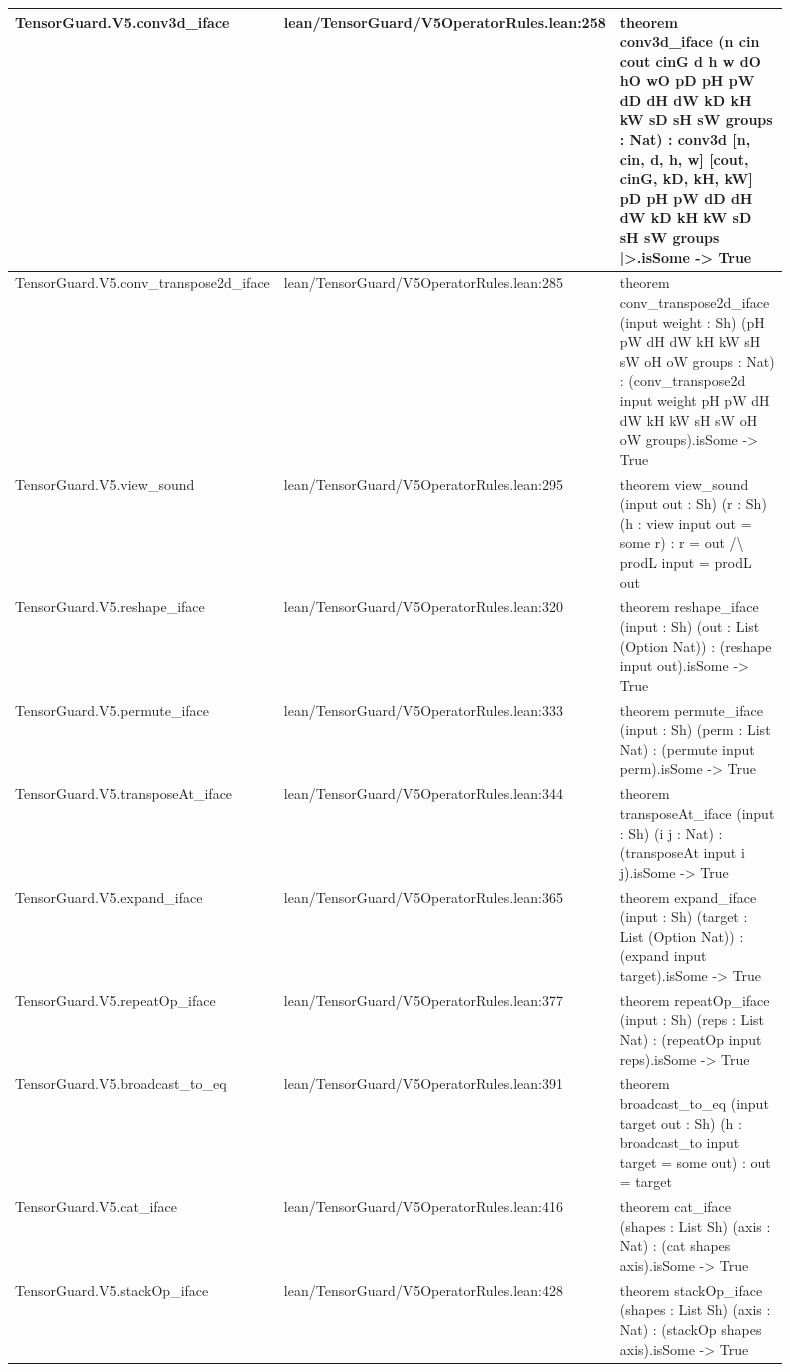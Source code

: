 \documentclass[10pt]{article}
\begin{document}
\begin{longtable}{|p{0.30\linewidth}|p{0.13\linewidth}|p{0.47\linewidth}|}
\hline
TensorGuard.V5.conv3d\_iface & lean/TensorGuard/V5OperatorRules.lean:258 & theorem conv3d\_iface (n cin cout cinG d h w dO hO wO pD pH pW dD dH dW kD kH kW sD sH sW groups : Nat) : conv3d [n, cin, d, h, w] [cout, cinG, kD, kH, kW] pD pH pW dD dH dW kD kH kW sD sH sW groups |>.isSome -> True \\
\hline
TensorGuard.V5.conv\_transpose2d\_iface & lean/TensorGuard/V5OperatorRules.lean:285 & theorem conv\_transpose2d\_iface (input weight : Sh) (pH pW dH dW kH kW sH sW oH oW groups : Nat) : (conv\_transpose2d input weight pH pW dH dW kH kW sH sW oH oW groups).isSome -> True \\
\hline
TensorGuard.V5.view\_sound & lean/TensorGuard/V5OperatorRules.lean:295 & theorem view\_sound (input out : Sh) (r : Sh) (h : view input out = some r) : r = out /\textbackslash{} prodL input = prodL out \\
\hline
TensorGuard.V5.reshape\_iface & lean/TensorGuard/V5OperatorRules.lean:320 & theorem reshape\_iface (input : Sh) (out : List (Option Nat)) : (reshape input out).isSome -> True \\
\hline
TensorGuard.V5.permute\_iface & lean/TensorGuard/V5OperatorRules.lean:333 & theorem permute\_iface (input : Sh) (perm : List Nat) : (permute input perm).isSome -> True \\
\hline
TensorGuard.V5.transposeAt\_iface & lean/TensorGuard/V5OperatorRules.lean:344 & theorem transposeAt\_iface (input : Sh) (i j : Nat) : (transposeAt input i j).isSome -> True \\
\hline
TensorGuard.V5.expand\_iface & lean/TensorGuard/V5OperatorRules.lean:365 & theorem expand\_iface (input : Sh) (target : List (Option Nat)) : (expand input target).isSome -> True \\
\hline
TensorGuard.V5.repeatOp\_iface & lean/TensorGuard/V5OperatorRules.lean:377 & theorem repeatOp\_iface (input : Sh) (reps : List Nat) : (repeatOp input reps).isSome -> True \\
\hline
TensorGuard.V5.broadcast\_to\_eq & lean/TensorGuard/V5OperatorRules.lean:391 & theorem broadcast\_to\_eq (input target out : Sh) (h : broadcast\_to input target = some out) : out = target \\
\hline
TensorGuard.V5.cat\_iface & lean/TensorGuard/V5OperatorRules.lean:416 & theorem cat\_iface (shapes : List Sh) (axis : Nat) : (cat shapes axis).isSome -> True \\
\hline
TensorGuard.V5.stackOp\_iface & lean/TensorGuard/V5OperatorRules.lean:428 & theorem stackOp\_iface (shapes : List Sh) (axis : Nat) : (stackOp shapes axis).isSome -> True \\

\end{longtable}
\end{document}
